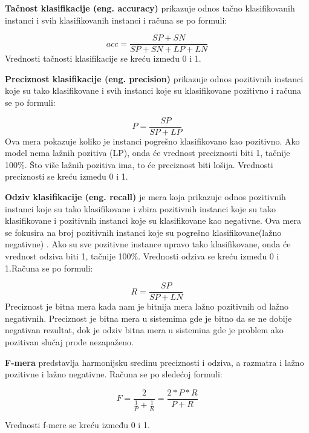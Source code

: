 \documentclass[12pt,oneside]{memoir}
\begin{document}
\textbf{Tačnost klasifikacije (eng. accuracy)} prikazuje odnos tačno klasifikovanih instanci i svih klasifikovanih instanci i računa se po formuli:

\begin{equation}
	acc = \frac{SP+SN}{SP+SN+LP+LN}
\end{equation}
\noindent
Vrednosti tačnosti klasifikacije se kreću između 0 i 1.

\textbf{Preciznost klasifikacije (eng. precision)} prikazuje odnos pozitivnih instanci koje su tako klasifikovane i svih instanci koje su klasifikovane pozitivno i računa se po formuli:

\begin{equation}
	P = \frac{SP}{SP+LP}
\end{equation}
\noindent
Ova mera pokazuje koliko je instanci pogrešno klasifikovano kao pozitivno. Ako model nema lažnih pozitiva (LP), onda će vrednost preciznosti biti 1, tačnije 100\%. Što više lažnih pozitiva ima, to će preciznost biti lošija. Vrednosti preciznosti se kreću između 0 i 1.

\textbf{Odziv klasifikacije (eng. recall)} je mera koja prikazuje odnos pozitivnih instanci koje su tako klasifikovane i zbira pozitivnih instanci koje su tako klasifikovane i pozitivnih instanci koje su klasifikovane kao negativne. Ova mera se fokusira na broj pozitivnih instanci koje su pogrešno klasifikovane(lažno negativne) . Ako su sve pozitivne instance upravo tako klasifikovane, onda će vrednost odziva biti 1, tačnije 100\%.  Vrednosti odziva se kreću između 0 i 1.Računa se po formuli:

\begin{equation}
	R = \frac{SP}{SP+LN}
\end{equation}
\noindent
Preciznost je bitna mera kada nam je bitnija mera lažno pozitivnih od lažno negativnih. Preciznost je bitna mera u sistemima gde je bitno da se ne dobije negativan rezultat, dok je odziv bitna mera u sistemina gde je problem ako pozitivan slučaj prođe nezapaženo.

\textbf{F-mera} predstavlja harmonijsku sredinu preciznosti i odziva,  a razmatra i lažno pozitivne i lažno negativne. Računa se po sledećoj formuli:

\begin{equation}
	F = \frac{2}{\frac{1}{P} + \frac{1}{R}} = \frac{2 * P * R }{P + R}
\end{equation}

\noindent
Vrednosti f-mere se kreću između 0 i 1.
\end{document}

